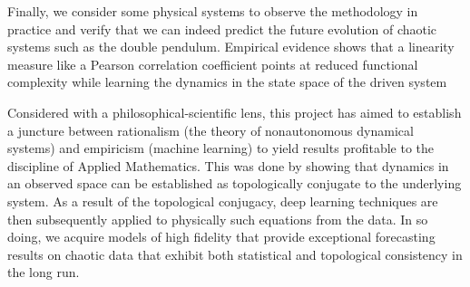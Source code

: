 \documentclass[a4paper,12pt,twoside]{report}
\begin{document}
Finally, we consider some physical systems to observe the methodology in practice and verify that we can indeed predict the future evolution of chaotic systems such as the double pendulum. Empirical evidence shows that a linearity measure like a Pearson correlation coefficient points at reduced functional complexity while learning the dynamics in the state space of the driven system


Considered with a philosophical-scientific lens, this project has aimed to establish a juncture between rationalism (the theory of nonautonomous dynamical systems) and empiricism (machine learning) to yield results profitable to the discipline of Applied Mathematics. This was done by showing that dynamics in an observed space can be established as topologically conjugate to the underlying system. As a result of the topological conjugacy, deep learning techniques are then subsequently applied to physically such equations from the data. In so doing, we acquire models of high fidelity that provide exceptional forecasting results on chaotic data that exhibit both statistical and topological consistency in the long run.
\end{document}
